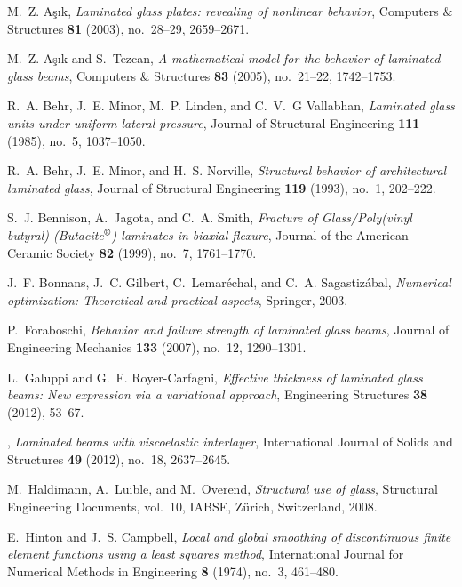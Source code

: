 \documentclass[11pt]{article}
\begin{document}
\begin{thebibliography}{10}

M.~Z. A\c{s}\i{}k, \emph{Laminated glass plates: revealing of nonlinear
  behavior}, Computers \& Structures \textbf{81} (2003), no.~28--29,
  2659--2671.

M.~Z. A\c{s}\i{}k and S.~Tezcan, \emph{A mathematical model for the behavior of
  laminated glass beams}, Computers \& Structures \textbf{83} (2005),
  no.~21--22, 1742--1753.

R.~A. Behr, J.~E. Minor, M.~P. Linden, and C.~V.~G Vallabhan, \emph{Laminated
  glass units under uniform lateral pressure}, Journal of Structural
  Engineering \textbf{111} (1985), no.~5, 1037--1050.

R.~A. Behr, J.~E. Minor, and H.~S. Norville, \emph{Structural behavior of
  architectural laminated glass}, Journal of Structural Engineering
  \textbf{119} (1993), no.~1, 202--222.

S.~J. Bennison, A.~Jagota, and C.~A. Smith, \emph{Fracture of {Glass/Poly(vinyl
  butyral) (Butacite$^\text{\textregistered}$)} laminates in biaxial flexure},
  Journal of the American Ceramic Society \textbf{82} (1999), no.~7,
  1761--1770.

J.~F. Bonnans, J.~C. Gilbert, C.~Lemar\'{e}chal, and C.~A. Sagastiz\'{a}bal,
  \emph{Numerical optimization: {Theoretical} and practical aspects}, Springer,
  2003.

P.~Foraboschi, \emph{Behavior and failure strength of laminated glass beams},
  Journal of Engineering Mechanics \textbf{133} (2007), no.~12, 1290--1301.

L.~Galuppi and G.~F. Royer-Carfagni, \emph{Effective thickness of laminated
  glass beams: {New} expression via a variational approach}, Engineering
  Structures \textbf{38} (2012), 53--67.

\bysame, \emph{Laminated beams with viscoelastic interlayer}, International
  Journal of Solids and Structures \textbf{49} (2012), no.~18, 2637--2645.

M.~Haldimann, A.~Luible, and M.~Overend, \emph{Structural use of glass},
  Structural Engineering Documents, vol.~10, {IABSE}, Z\"{u}rich, Switzerland,
  2008.

E.~Hinton and J.~S. Campbell, \emph{Local and global smoothing of discontinuous
  finite element functions using a least squares method}, International Journal
  for Numerical Methods in Engineering \textbf{8} (1974), no.~3, 461--480.


\end{thebibliography}
\end{document}
